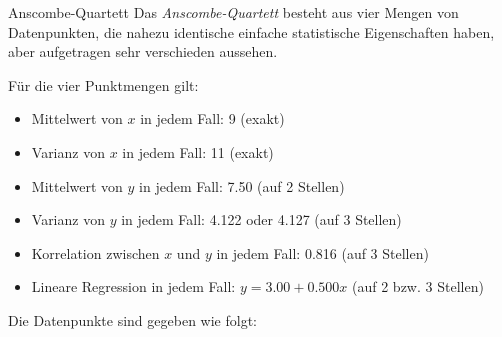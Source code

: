 \begin{example}{Anscombe-Quartett}
    Das \emph{Anscombe-Quartett} besteht aus vier Mengen von Datenpunkten, die nahezu identische einfache statistische Eigenschaften haben, aber aufgetragen sehr verschieden aussehen.

    Für die vier Punktmengen gilt:
    \begin{itemize}
        \item Mittelwert von $x$ in jedem Fall: 9 (exakt)
        \item Varianz von $x$ in jedem Fall: 11 (exakt)
        \item Mittelwert von $y$ in jedem Fall: 7.50 (auf 2 Stellen)
        \item Varianz von $y$ in jedem Fall: 4.122 oder 4.127 (auf 3 Stellen)
        \item Korrelation zwischen $x$ und $y$ in jedem Fall: 0.816 (auf 3 Stellen)
        \item Lineare Regression in jedem Fall: $y = 3.00 + 0.500x$ (auf 2 bzw. 3 Stellen)
    \end{itemize}

    Die Datenpunkte sind gegeben wie folgt:


\end{example}
